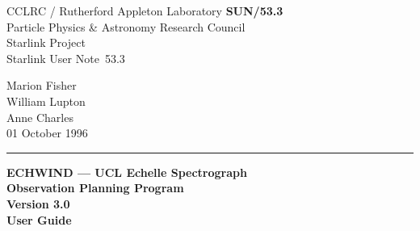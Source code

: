 \documentclass[11pt]{article}
\newcommand{\stardoccategory}  {Starlink User Note}
\newcommand{\stardocinitials}  {SUN}
\newcommand{\stardocnumber}    {53.3}
\newcommand{\stardocauthors}   {Marion Fisher\\
                                William Lupton\\
                                Anne Charles}
\newcommand{\stardocdate}      {01 October 1996}
\newcommand{\stardoctitle}     {ECHWIND --- UCL Echelle Spectrograph\\
                                Observation Planning Program}
\newcommand{\stardocversion}   {Version 3.0}
\newcommand{\stardocmanual}    {User Guide}
\newcommand{\stardocname}{\stardocinitials /\stardocnumber}
\newenvironment{latexonly}{}{}
\begin{document}
\thispagestyle{empty}

\begin{latexonly}
   CCLRC / {\sc Rutherford Appleton Laboratory} \hfill {\bf \stardocname}\\
   {\large Particle Physics \& Astronomy Research Council}\\
   {\large Starlink Project\\}
   {\large \stardoccategory\ \stardocnumber}
   \begin{flushright}
   \stardocauthors\\
   \stardocdate
   \end{flushright}
   \vspace{-4mm}
   \rule{\textwidth}{0.5mm}
   \vspace{5mm}
   \begin{center}
   {\Huge\bf  \stardoctitle \\ [2.5ex]}
   {\LARGE\bf \stardocversion \\ [4ex]}
   {\Huge\bf  \stardocmanual}
   \end{center}
   \vspace{5mm}

\end{latexonly}
\end{document}
